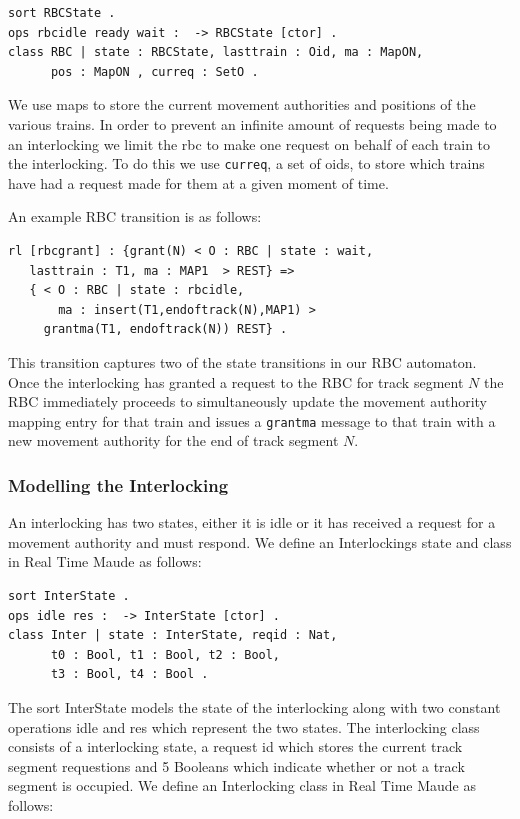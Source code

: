 \begin{lstlisting}[caption = The RBC state and class definition in Maude]
sort RBCState .
ops rbcidle ready wait :  -> RBCState [ctor] .
class RBC | state : RBCState, lasttrain : Oid, ma : MapON, 
      pos : MapON , curreq : SetO .
\end{lstlisting}

We use maps to store the current movement authorities and positions of the various trains. In order to prevent an infinite amount of requests being made to an interlocking we limit the rbc to make one request on behalf of each train to the interlocking.  To do this we use  \texttt{curreq}, a set of oids, to store which trains have had a request made for them at a given moment of time.

An example RBC transition is as follows:
\begin{lstlisting}[caption = The state transition for the granting of a movement authority]
rl [rbcgrant] : {grant(N) < O : RBC | state : wait, 
   lasttrain : T1, ma : MAP1  > REST} => 
   { < O : RBC | state : rbcidle, 
       ma : insert(T1,endoftrack(N),MAP1) > 
     grantma(T1, endoftrack(N)) REST} .
\end{lstlisting}

This transition captures two of the state transitions in our RBC automaton. Once the interlocking has granted a request to the RBC for track segment $N$ the RBC immediately proceeds to simultaneously update the movement authority mapping entry for that train and issues a \texttt{grantma} message to that train with a new movement authority for the end of track segment $N$.

\subsubsection*{Modelling the Interlocking}
An interlocking has two states, either it is idle or it has received a request for a movement authority and must respond. We define an Interlockings state and class in Real Time Maude as follows:

\begin{lstlisting}[caption = The interlocking class and states in Maude]
sort InterState .
ops idle res :  -> InterState [ctor] .
class Inter | state : InterState, reqid : Nat, 
      t0 : Bool, t1 : Bool, t2 : Bool, 
      t3 : Bool, t4 : Bool .
\end{lstlisting}

The sort InterState models the state of the interlocking along with two constant operations idle and res which represent the two states. The interlocking class consists of a interlocking state, a request id which stores the current track segment requestions and 5 Booleans which indicate whether or not a track segment is occupied. We define an Interlocking class in Real Time Maude as follows:


